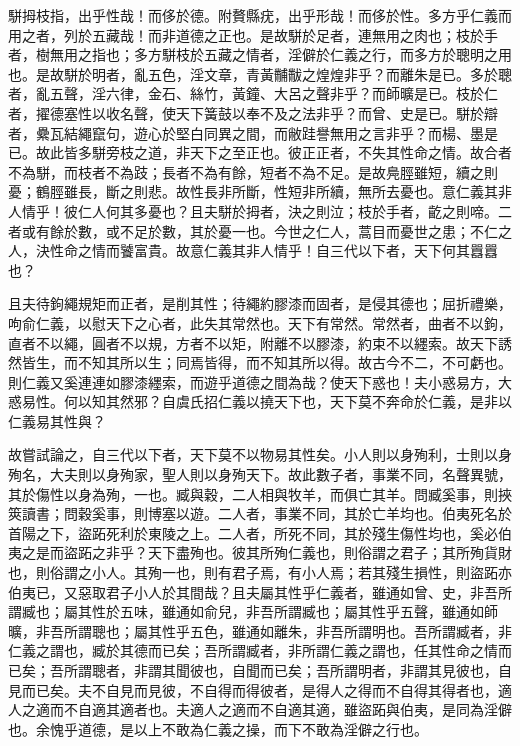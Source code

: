 
\begin{pinyinscope}
駢拇枝指，出乎性哉！而侈於德。附贅縣疣，出乎形哉！而侈於性。多方乎仁義而用之者，列於五藏哉！而非道德之正也。是故駢於足者，連無用之肉也；枝於手者，樹無用之指也；多方駢枝於五藏之情者，淫僻於仁義之行，而多方於聰明之用也。是故駢於明者，亂五色，淫文章，青黃黼黻之煌煌非乎？而離朱是已。多於聰者，亂五聲，淫六律，金石、絲竹，黃鐘、大呂之聲非乎？而師曠是已。枝於仁者，擢德塞性以收名聲，使天下簧鼓以奉不及之法非乎？而曾、史是已。駢於辯者，纍瓦結繩竄句，遊心於堅白同異之間，而敝跬譽無用之言非乎？而楊、墨是已。故此皆多駢旁枝之道，非天下之至正也。彼正正者，不失其性命之情。故合者不為駢，而枝者不為跂；長者不為有餘，短者不為不足。是故鳧脛雖短，續之則憂；鶴脛雖長，斷之則悲。故性長非所斷，性短非所續，無所去憂也。意仁義其非人情乎！彼仁人何其多憂也？且夫駢於拇者，決之則泣；枝於手者，齕之則啼。二者或有餘於數，或不足於數，其於憂一也。今世之仁人，蒿目而憂世之患；不仁之人，決性命之情而饕富貴。故意仁義其非人情乎！自三代以下者，天下何其囂囂也？

且夫待鉤繩規矩而正者，是削其性；待繩約膠漆而固者，是侵其德也；屈折禮樂，呴俞仁義，以慰天下之心者，此失其常然也。天下有常然。常然者，曲者不以鉤，直者不以繩，圓者不以規，方者不以矩，附離不以膠漆，約束不以纆索。故天下誘然皆生，而不知其所以生；同焉皆得，而不知其所以得。故古今不二，不可虧也。則仁義又奚連連如膠漆纆索，而遊乎道德之間為哉？使天下惑也！夫小惑易方，大惑易性。何以知其然邪？自虞氏招仁義以撓天下也，天下莫不奔命於仁義，是非以仁義易其性與？

故嘗試論之，自三代以下者，天下莫不以物易其性矣。小人則以身殉利，士則以身殉名，大夫則以身殉家，聖人則以身殉天下。故此數子者，事業不同，名聲異號，其於傷性以身為殉，一也。臧與穀，二人相與牧羊，而俱亡其羊。問臧奚事，則挾筴讀書；問穀奚事，則博塞以遊。二人者，事業不同，其於亡羊均也。伯夷死名於首陽之下，盜跖死利於東陵之上。二人者，所死不同，其於殘生傷性均也，奚必伯夷之是而盜跖之非乎？天下盡殉也。彼其所殉仁義也，則俗謂之君子；其所殉貨財也，則俗謂之小人。其殉一也，則有君子焉，有小人焉；若其殘生損性，則盜跖亦伯夷已，又惡取君子小人於其間哉？且夫屬其性乎仁義者，雖通如曾、史，非吾所謂臧也；屬其性於五味，雖通如俞兒，非吾所謂臧也；屬其性乎五聲，雖通如師曠，非吾所謂聰也；屬其性乎五色，雖通如離朱，非吾所謂明也。吾所謂臧者，非仁義之謂也，臧於其德而已矣；吾所謂臧者，非所謂仁義之謂也，任其性命之情而已矣；吾所謂聰者，非謂其聞彼也，自聞而已矣；吾所謂明者，非謂其見彼也，自見而已矣。夫不自見而見彼，不自得而得彼者，是得人之得而不自得其得者也，適人之適而不自適其適者也。夫適人之適而不自適其適，雖盜跖與伯夷，是同為淫僻也。余愧乎道德，是以上不敢為仁義之操，而下不敢為淫僻之行也。


\end{pinyinscope}
